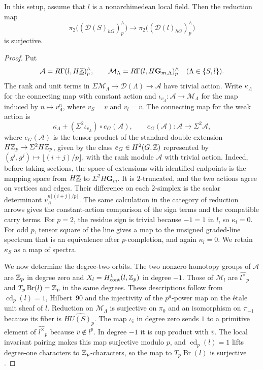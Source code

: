 \begin{lemma}\label{lem:second-two-determinant-orbits}
In this setup, assume that $l$ is a nonarchimedean local field.
Then the reduction map
\[
 \pi_2\bigl((\mathcal D(S)_{hG})^\wedge_p\bigr)\longrightarrow\pi_2\bigl((\mathcal D(l)_{hG})^\wedge_p\bigr)
\]
is surjective.
\end{lemma}
\begin{proof}
Put
\[
 \mathcal A=R\Gamma(l,H\underline{\mathbb Z})^\wedge_p,\qquad
 \mathcal M_\Lambda=R\Gamma(l,H\mathbf G_{m,\Lambda})^\wedge_p\quad(\Lambda\in\{S,l\}).
\]
The rank and unit terms in $\Sigma\mathcal M_\Lambda\to\mathcal D(\Lambda)\to\mathcal A$ have trivial action.
Write $\kappa_\Lambda$ for the connecting map with constant action and $\iota_{v_\Lambda}\colon\mathcal A\to\mathcal M_\Lambda$ for the map induced by $n\mapsto v_\Lambda^n$, where $v_S=v$ and $v_l=\bar v$.
The connecting map for the weak action is
\[
 \kappa_\Lambda+(\Sigma^2\iota_{v_\Lambda})\circ e_G(\mathcal A),
 \qquad e_G(\mathcal A)\colon\mathcal A\longrightarrow\Sigma^2\mathcal A,
\]
where $e_G(\mathcal A)$ is the tensor product of the standard double extension $H\mathbb Z_p\to\Sigma^2H\mathbb Z_p$, given by the class $e_G\in H^2(G,\mathbb Z)$ represented by $(g^i,g^j)\mapsto\lfloor(i+j)/p\rfloor$, with the rank module $\mathcal A$ with trivial action.
Indeed, before taking sections, the space of extensions with identified endpoints is the mapping space from $H\underline{\mathbb Z}$ to $\Sigma^2H\mathbf G_m$.
It is $2$-truncated, and the two actions agree on vertices and edges.
Their difference on each $2$-simplex is the scalar determinant $v_\Lambda^{n\lfloor(i+j)/p\rfloor}$.
The same calculation in the category of reduction arrows gives the constant-action comparison of the sign terms and the compatible carry terms.
For $p=2$, the residue sign is trivial because $-1=1$ in $l$, so $\kappa_l=0$.
For odd $p$, tensor square of the line gives a map to the unsigned graded-line spectrum that is an equivalence after $p$-completion, and again $\kappa_l=0$.
We retain $\kappa_S$ as a map of spectra.

We now determine the degree-two orbits.
The two nonzero homotopy groups of $\mathcal A$ are $\mathbb Z_p$ in degree zero and $X_l=H^1_{\mathrm{cont}}(l,\mathbb Z_p)$ in degree $-1$.
Those of $\mathcal M_l$ are $\widehat{l^\times}_p$ and $T_p\operatorname{Br}(l)=\mathbb Z_p$ in the same degrees.
These descriptions follow from $\operatorname{cd}_p(l)=1$, Hilbert~90 and the injectivity of the $p^a$-power map on the \'etale unit sheaf of $l$.
Reduction on $\mathcal M_\Lambda$ is surjective on $\pi_0$ and an isomorphism on $\pi_{-1}$ because its fiber is $H\widehat{U(S)}_p$.
The map $\iota_{\bar v}$ in degree zero sends $1$ to a primitive element of $\widehat{l^\times}_p$ because $\bar v\notin l^p$.
In degree $-1$ it is cup product with $\bar v$.
The local invariant pairing makes this map surjective modulo $p$, and $\operatorname{cd}_p(l)=1$ lifts degree-one characters to $\mathbb Z_p$-characters, so the map to $T_p\operatorname{Br}(l)$ is surjective \cite[\S5]{Kurihara2000}.


\end{proof}
